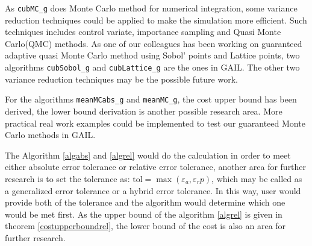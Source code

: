 \documentclass{iitthesis}
\theoremstyle{definition}
\begin{document}
As {\tt cubMC\_g} does Monte Carlo method for numerical integration, some variance reduction techniques could be applied to make the simulation more efficient. Such techniques includes control variate, importance sampling and Quasi Monte Carlo(QMC) methods. As one of our colleagues has been working on guaranteed adaptive quasi Monte Carlo method using Sobol' points \cite{Sobol67} and Lattice points, two algorithms {\tt cubSobol\_g} and {\tt cubLattice\_g} are the ones in GAIL. The other two variance reduction techniques may be the possible future work.

For the algorithms {\tt meanMCabs\_g} and {\tt meanMC\_g}, the cost upper bound has been derived, the lower bound derivation is another possible research area. More practical real work examples could be implemented to test our guaranteed Monte Carlo methods in GAIL.

The Algorithm \ref{algabs} and \ref{algrel} would do the calculation in order to meet either absolute error tolerance or relative error tolerance, another area for further research is to set the tolerance as: $\text{tol} = \max(\varepsilon_a, \varepsilon_r p)$, which may be called as a generalized error tolerance or a hybrid error tolerance. In this way, user would provide both of the tolerance and the algorithm would determine which one would be met first. As the upper bound of the algorithm \ref{algrel} is given in theorem \ref{costupperboundrel}, the lower bound of the cost is also an area for further research. 

\appendix




%






%
%
%
\end{document}
